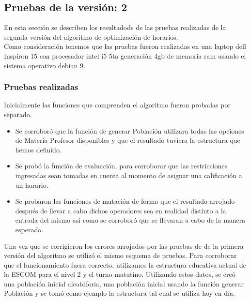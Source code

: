 \subsection{Pruebas de la versión: 2} \label{chp:pruebasV2}
En esta sección se describen los resultadods de las pruebas realizadas de la segunda versión del algoritmo de optimización de horarios.\\

Como consideración tenemos que las pruebas fueron realizadas en una laptop dell Inspiron 15 con procesador intel i5 5ta generación 4gb de memoria ram usando el sistema operativo debian 9.\\


\subsubsection{Pruebas realizadas}

Inicialmente las funciones que comprenden el algoritmo fueron probadas por separado. \\

\begin{itemize}
	\item Se corroboró que la función de generar Población utilizara todas las opciones de Materia-Profesor disponibles y que el resultado tuviera la estructura que hemos definido. 
	
	\item Se probó la función de evaluación, para corroborar que las restricciones ingresadas sean tomadas en cuenta al momento de asignar una calificación a un horario.
	
	\item Se probaron las funciones de mutación de forma que el resultado arrojado después de llevar a cabo dichos operadores sea en realidad distinto a la entrada del mismo así como se corroboró que se llevaran a cabo de la manera esperada.
	
\end{itemize}

Una vez que se corrigieron los errores arrojados por las pruebas de de la primera versión del algoritmo se utilizó el mismo esquema de pruebas. Para corroborar que el funcionamiento fuera correcto, utilizamos la estructura educativa actual de la ESCOM para el nivel 2 y el turno matutino. Utilizando estos datos, se creó una población inicial aleatdforia, una población inicial usando la función generar Población y se tomó como ejemplo la estructura tal cual se utiliza hoy en día.\\

